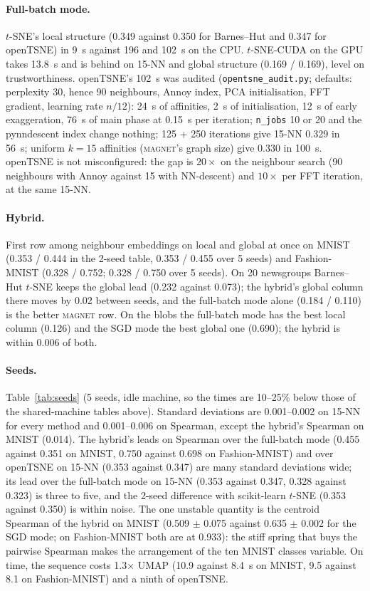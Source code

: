 \documentclass[11pt]{article}
\newcommand{\magnet}{\textsc{magnet}}
\begin{document}
\paragraph{Full-batch mode.} $t$-SNE's local structure (0.349 against 0.350 for Barnes--Hut and 0.347
for openTSNE) in 9~s against 196 and 102~s on the CPU. $t$-SNE-CUDA on the GPU takes 13.8~s and is behind
on 15-NN and global structure (0.169 / 0.169), level on trustworthiness. openTSNE's 102~s was audited
(\texttt{opentsne\_audit.py}; defaults: perplexity 30, hence 90 neighbours, Annoy index, PCA
initialisation, FFT gradient, learning rate $n/12$): 24~s of affinities, 2~s of initialisation, 12~s of
early exaggeration, 76~s of main phase at 0.15~s per iteration; \texttt{n\_jobs} 10 or 20 and the
pynndescent index change nothing; 125 + 250 iterations give 15-NN 0.329 in 56~s; uniform $k = 15$
affinities (\magnet{}'s graph size) give 0.330 in 100~s. openTSNE is not misconfigured: the gap is
$20\times$ on the neighbour search (90 neighbours with Annoy against 15 with NN-descent) and $10\times$
per FFT iteration, at the same 15-NN.

\paragraph{Hybrid.} First row among neighbour embeddings on local and global at once on MNIST (0.353 /
0.444 in the 2-seed table, 0.353 / 0.455 over 5 seeds) and Fashion-MNIST (0.328 / 0.752; 0.328 / 0.750
over 5 seeds). On 20
newsgroups Barnes--Hut $t$-SNE keeps the global lead (0.232 against 0.073); the hybrid's global column
there moves by 0.02 between seeds, and the full-batch mode alone (0.184 / 0.110) is the better \magnet{}
row. On the blobs the full-batch mode has the best local column (0.126) and the SGD mode the best global
one (0.690); the hybrid is within 0.006 of both.

\paragraph{Seeds.} Table~\ref{tab:seeds} (5 seeds, idle machine, so the times are 10--25\% below
those of the shared-machine tables above). Standard deviations are 0.001--0.002 on 15-NN for every
method and 0.001--0.006 on Spearman, except the hybrid's Spearman on MNIST (0.014). The hybrid's leads
on Spearman over the full-batch mode (0.455 against 0.351 on MNIST, 0.750 against 0.698 on Fashion-MNIST)
and over openTSNE on 15-NN (0.353 against 0.347) are many standard deviations wide; its lead over the
full-batch mode on 15-NN (0.353 against 0.347, 0.328 against 0.323) is three to five, and the 2-seed
difference with scikit-learn $t$-SNE (0.353 against 0.350) is within noise. The one unstable quantity is
the centroid Spearman of the hybrid on MNIST (0.509 $\pm$ 0.075 against 0.635 $\pm$ 0.002 for the SGD
mode; on Fashion-MNIST both are at 0.933): the stiff spring that buys the pairwise Spearman makes the
arrangement of the ten MNIST classes variable. On time, the sequence costs 1.3$\times$ UMAP (10.9
against 8.4~s on MNIST, 9.5 against 8.1 on Fashion-MNIST) and a ninth of openTSNE.
\end{document}
